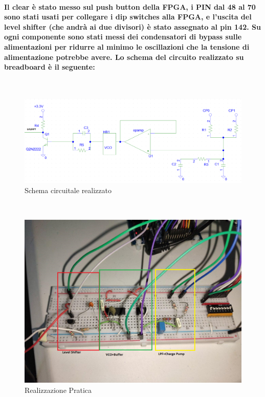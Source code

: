 \documentclass{article}
\begin{document}
\paragraph{Il clear è stato messo sul push button della FPGA, i PIN dal 48 al 70 sono stati usati per collegare i dip switches alla FPGA, e l'uscita del level shifter (che andrà ai due divisori) è stato assegnato al pin 142. Su ogni componente sono stati messi dei condensatori di bypass sulle alimentazioni per ridurre al minimo le oscillazioni che la tensione di alimentazione potrebbe avere.
Lo schema del circuito realizzato su breadboard è il seguente:}
 ~\begin{figure}[!h]%
\includegraphics[scale=0.35]{SchemaCirc.png} 
\centering
\caption{Schema circuitale realizzato}
\label{fig:foo}
\end{figure}

 ~\begin{figure}[!h]%
\includegraphics[scale=0.3]{Circuito.png} 
\centering
\caption{Realizzazione Pratica}
\label{fig:foo}
\end{figure}
\newpage
\end{document}
